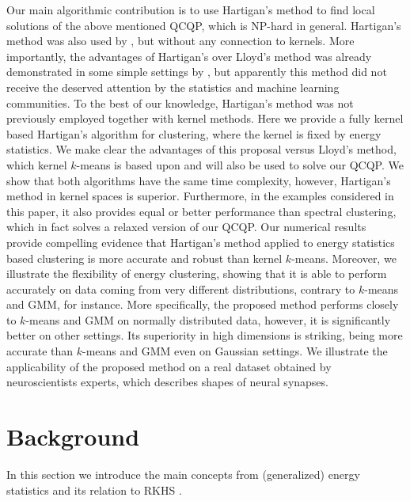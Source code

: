 \documentclass{article}
\begin{document}
Our main 
algorithmic contribution is to use Hartigan's method \citep{Hartigan} to 
find local solutions of the above mentioned QCQP, which is NP-hard in general.
Hartigan's method was also used by \citet{Kgroups}, but without any
connection to kernels. More importantly, the 
advantages of Hartigan's
over Lloyd's method was already demonstrated 
in some simple settings by
\citet{Telgarsky,Slonin}, but apparently this method did not receive 
the deserved attention by the statistics and machine learning communities. 
To the 
best of our knowledge, Hartigan's method was not previously 
employed together with kernel methods. 
Here we provide a fully kernel based Hartigan's algorithm for clustering,
where the kernel is fixed by energy statistics. 
We make clear the advantages of this proposal versus 
Lloyd's method, which kernel $k$-means is based upon and will also be used 
to solve our QCQP. We show that both algorithms  have the same
time complexity, however, Hartigan's method in kernel spaces is superior. 
Furthermore, in the examples considered in this paper, it 
also provides equal or better performance than spectral clustering,
which in fact solves a relaxed version of our QCQP.
Our numerical results provide compelling evidence that 
Hartigan's method applied to energy statistics based clustering
is more accurate and robust than 
kernel $k$-means. Moreover, we illustrate the
flexibility of energy clustering,  
showing that it is able to perform accurately on data coming from 
very different distributions, contrary to $k$-means and GMM, for instance.
More specifically, the proposed method performs 
closely to $k$-means and GMM on normally distributed data, however,
it is significantly better on other settings. 
Its superiority in high dimensions is striking, being more accurate 
than $k$-means and GMM even on Gaussian settings.
We illustrate the applicability of the proposed method on a real dataset
obtained by neuroscientists experts, which describes 
shapes of neural synapses. 


\section{Background}
\label{sec:background}

In this section we introduce the main concepts from (generalized) energy
statistics \citep{Szkely2013,Lyons} and its relation to 
RKHS \citep{Sejdinovic2013}.
\end{document}
